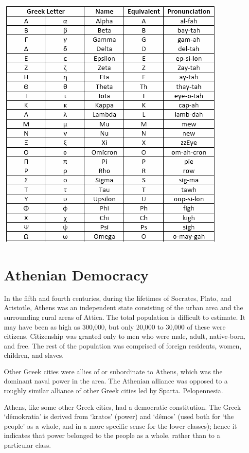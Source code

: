 \documentclass[oneside]{article}
\begin{document}
\includegraphics{apha.png}





\section{Athenian Democracy}

In the fifth and fourth centuries, during the lifetimes of Socrates, Plato, and Aristotle, 
Athens was an independent state consisting of the urban area and the surrounding rural areas of Attica. The total population is difficult to estimate. It may have been as high as 300,000, but only 20,000 to 30,000 of these were citizens. Citizenship was granted only to men who were male, adult, native-born, and free. The rest of the population was comprised of foreign residents, women, children, and slaves. 

Other Greek cities were allies of or subordinate to Athens, which was the dominant naval power in the area. The Athenian alliance was opposed to a roughly similar alliance of other Greek cities led by Sparta. Pelopennesia. 

Athens, like some other Greek cities, had a democratic constitution. The Greek ‘dêmokratia’  is derived from ‘kratos’ (power) and ‘dêmos’ (used both for ‘the people’ as a whole, and in a more specific sense for the lower classes); hence it indicates that power belonged to the people as a whole, rather than to a particular class. 
\end{document}
